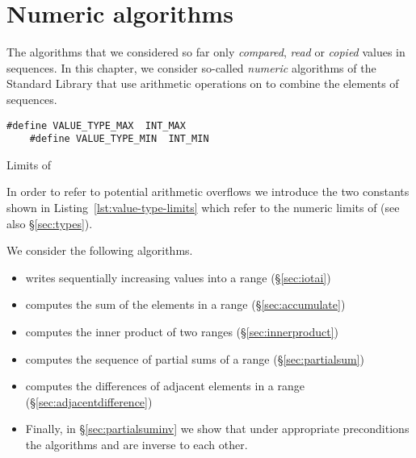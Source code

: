 
\chapter{Numeric algorithms}

The algorithms that we considered so far only \emph{compared}, \emph{read} or
\emph{copied} values in sequences.
In this chapter, we consider so-called \emph{numeric} algorithms of the 
\cxx Standard Library \cite[\S 29.8]{cxx-17-draft} that use arithmetic
operations on  to
combine the elements of sequences.

\begin{listing}[hbt]
\begin{center}
\begin{minipage}{0.5\textwidth}
\begin{lstlisting}[style=acsl-block]
    #define VALUE_TYPE_MAX  INT_MAX 
    #define VALUE_TYPE_MIN  INT_MIN
\end{lstlisting}
\end{minipage}
\end{center}
\vspace*{-0.5cm}
\caption{Limits of }
\end{listing}

In order to refer to potential arithmetic overflows we introduce the
two constants shown in Listing~\ref{lst:value-type-limits}
which refer to the numeric limits of  
(see also \S\ref{sec:types}).

We consider the following algorithms.

\begin{itemize}

\item \iotai 
writes sequentially increasing values into a range
(\S\ref{sec:iotai})
 
\item \accumulate 
computes the sum of the elements in a range
(\S\ref{sec:accumulate})

\item \innerproduct 
computes the inner product of two ranges
(\S\ref{sec:innerproduct})

\item \partialsum 
computes the sequence of partial sums of a range
(\S\ref{sec:partialsum})

\item \adjacentdifference 
computes the differences of adjacent elements in a range 
(\S\ref{sec:adjacentdifference})

\item
Finally, in \S\ref{sec:partialsuminv} we show that under
appropriate preconditions the algorithms \partialsum and
\adjacentdifference are inverse to each other.

\end{itemize}

